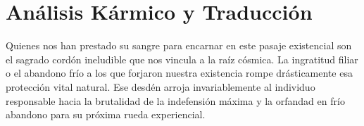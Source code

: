 \section{Análisis Kármico y Traducción}
\begin{figure}
  \vspace{-1.5em}
  \begin{center}
  \end{center}
  \vspace{-1.5em}
\end{figure}
Quienes nos han prestado su sangre para encarnar en este pasaje existencial son el sagrado cordón ineludible que nos vincula a la raíz cósmica. La ingratitud filiar o el abandono frío a los que forjaron nuestra existencia rompe drásticamente esa protección vital natural. Ese desdén arroja invariablemente al individuo responsable hacia la brutalidad de la indefensión máxima y la orfandad en frío abandono para su próxima rueda experiencial.

